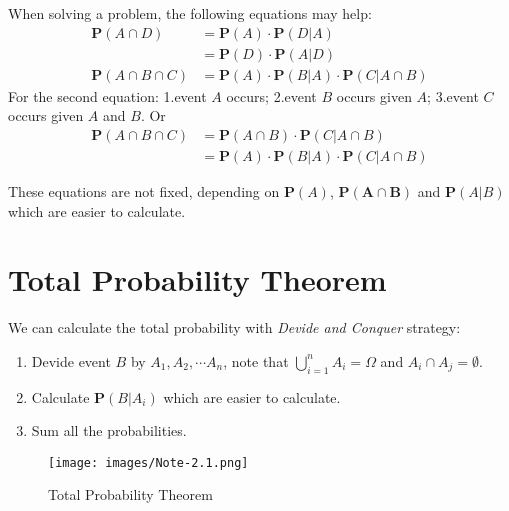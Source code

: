 When solving a problem, the following equations may help:
\begin{align}
    \mathbf{P}(A \cap D) &= \mathbf{P}(A) \cdot \mathbf{P}(D|A) \\
    &= \mathbf{P}(D) \cdot \mathbf{P}(A|D) \\
    \mathbf{P}(A \cap B \cap C) &= \mathbf{P}(A) \cdot \mathbf{P}(B|A) \cdot \mathbf{P}(C|A \cap B)
\end{align}
For the second equation: 1.event $A$ occurs; 2.event $B$ occurs given $A$; 3.event $C$ occurs given $A$ and $B$. Or
\begin{align*}
    \mathbf{P}(A \cap B \cap C) &= \mathbf{P}(A \cap B) \cdot \mathbf{P}(C | A \cap B) \\ 
    &= \mathbf{P}(A) \cdot \mathbf{P}(B | A) \cdot \mathbf{P}(C | A \cap B)
\end{align*}
\begin{remark}
    These equations are not fixed, depending on $\mathbf{P}(A)$, $\mathbf{P(A \cap B)}$ and $\mathbf{P}(A | B)$ which are easier to calculate.
\end{remark}

\section{Total Probability Theorem}
We can calculate the total probability with \textit{Devide and Conquer} strategy:
\begin{enumerate}
    \item Devide event $B$ by $A_1, A_2, \cdots A_n$, note that $\bigcup_{i=1}^n A_i = \varOmega$ and $A_i \cap A_j = \emptyset$.
    \item Calculate $\mathbf{P}(B | A_i)$ which are easier to calculate.
    \item Sum all the probabilities.
\end{enumerate}
\begin{figure}[H]
    \centering
    \texttt{[image: images/Note-2.1.png]}
    \caption{Total Probability Theorem}
    \label{fig:total-probability}
\end{figure}

